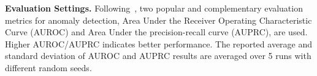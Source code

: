 \documentclass{article}
\begin{document}




\noindent\textbf{Evaluation Settings.} 
Following~\cite{TAM_qiao2024truncated,chai2022can,pang2021toward,wang2022cross,zhou2022unseen}, two popular and complementary evaluation metrics for anomaly detection, Area Under the Receiver Operating Characteristic Curve (AUROC) and Area Under the precision-recall curve (AUPRC), are used. Higher AUROC/AUPRC indicates better performance. The reported average and standard deviation of AUROC and AUPRC results are averaged over 5 runs with different random seeds. 
\end{document}
